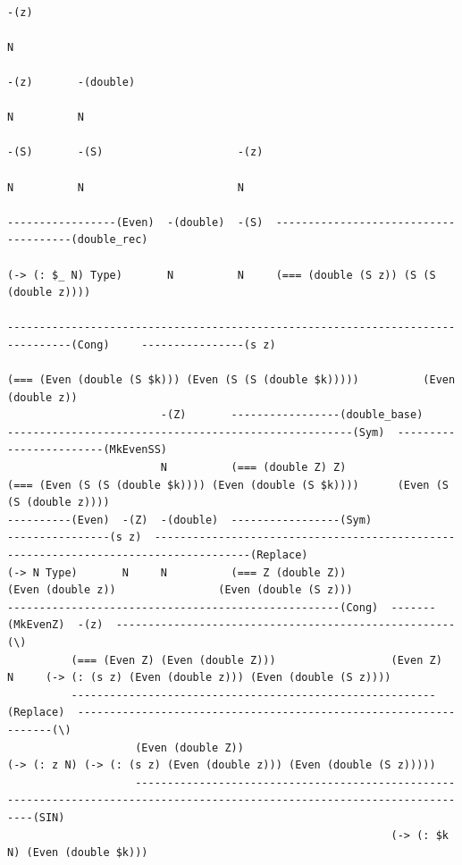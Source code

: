 \documentclass[aspectratio=169]{beamer}
\makeatletter
\newcommand{\verytiny}{\@setfontsize{\srcsize}{3.5pt}{3.5pt}}
\makeatother
\begin{document}
\begin{frame}[fragile]
{\verytiny
\begin{verbatim}
                                                                                                                     -(z)
                                                                                                                     N
                                                                                                          -(z)       -(double)
                                                                                                          N          N
                                                                                                          -(S)       -(S)                     -(z)
                                                                                                          N          N                        N
                                                                                 -----------------(Even)  -(double)  -(S)  --------------------------------------(double_rec)
                                                                                 (-> (: $_ N) Type)       N          N     (=== (double (S z)) (S (S (double z))))
                                                                                 --------------------------------------------------------------------------------(Cong)     ----------------(s z)
                                                                                                           (=== (Even (double (S $k))) (Even (S (S (double $k)))))          (Even (double z))
                        -(Z)       -----------------(double_base)                                          ------------------------------------------------------(Sym)  ------------------------(MkEvenSS)
                        N          (=== (double Z) Z)                                                      (=== (Even (S (S (double $k)))) (Even (double (S $k))))      (Even (S (S (double z))))
----------(Even)  -(Z)  -(double)  -----------------(Sym)                           ----------------(s z)  -------------------------------------------------------------------------------------(Replace)
(-> N Type)       N     N          (=== Z (double Z))                               (Even (double z))                (Even (double (S z)))
----------------------------------------------------(Cong)  -------(MkEvenZ)  -(z)  -----------------------------------------------------(\)
          (=== (Even Z) (Even (double Z)))                  (Even Z)          N     (-> (: (s z) (Even (double z))) (Even (double (S z))))
          ---------------------------------------------------------(Replace)  ------------------------------------------------------------------(\)
                    (Even (double Z))                                         (-> (: z N) (-> (: (s z) (Even (double z))) (Even (double (S z)))))
                    ----------------------------------------------------------------------------------------------------------------------------(SIN)
                                                            (-> (: $k N) (Even (double $k)))
\end{verbatim}
}

\end{frame}
\end{document}
